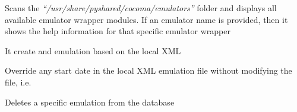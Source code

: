 \documentclass[letterpaper,10pt,english]{sphinxhowto}
\begin{document}

\begin{fulllineitems}
\label{COCOMA/02_how_to_use_it:cmdoption-ccmsh-e}
Scans the \emph{``/usr/share/pyshared/cocoma/emulators''} folder and displays all available emulator wrapper modules. If an emulator name is provided, then it shows the help information for that specific emulator wrapper

\end{fulllineitems}


\begin{fulllineitems}
\label{COCOMA/02_how_to_use_it:cmdoption-ccmsh-x}
It create and emulation based on the local XML

\end{fulllineitems}


\begin{fulllineitems}
\label{COCOMA/02_how_to_use_it:cmdoption-ccmsh-n}
Override any start date in the local XML emulation file without modifying the file, i.e. 

\end{fulllineitems}


\begin{fulllineitems}
\label{COCOMA/02_how_to_use_it:cmdoption-ccmsh-d}
Deletes a specific emulation from the database

\end{fulllineitems}
\end{document}
